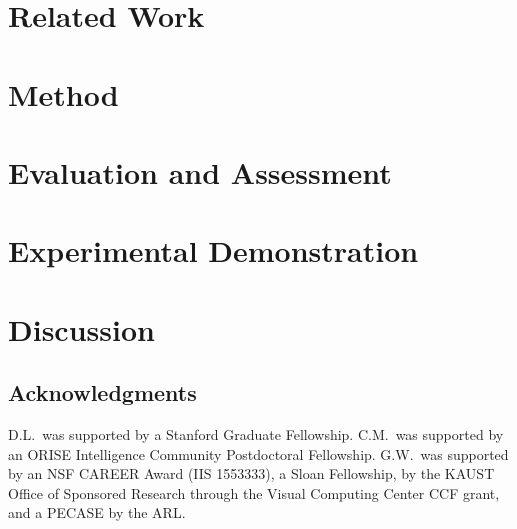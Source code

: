 \documentclass[runningheads]{llncs}
\begin{document}
\vspace{-5pt}
\section{Related Work}
\vspace{-5pt}
\label{sec:related}


\vspace{-5pt}
\section{Method}
\vspace{-5pt}
\label{sec:method}


\vspace{-5pt}
\section{Evaluation and Assessment}
\vspace{-5pt}
\label{sec:evaluation}


\vspace{-5pt}
\section{Experimental Demonstration}
\vspace{-5pt}
\label{sec:prototype}


\vspace{-5pt}
\section{Discussion}
\vspace{-5pt}
\label{sec:discussion}


\vspace{-4 pt}
\subsection*{Acknowledgments}
D.L.~was supported by a Stanford Graduate Fellowship. 
C.M.~was supported by an ORISE Intelligence Community Postdoctoral Fellowship. G.W.~was supported by an NSF CAREER Award (IIS 1553333), a Sloan Fellowship, by the KAUST Office of Sponsored Research through the Visual Computing Center CCF grant, and a PECASE by the ARL. 


\clearpage
%
%

% 

\end{document}
